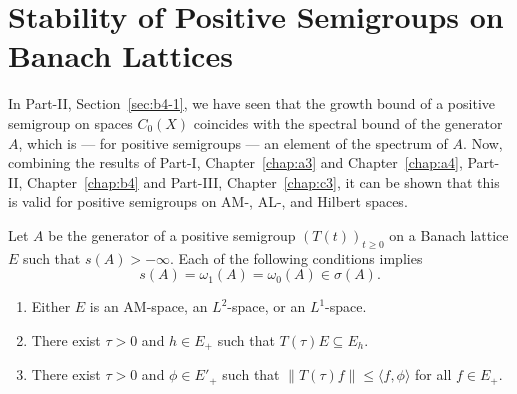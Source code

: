 \section{Stability of Positive Semigroups on Banach Lattices}\label{sec:c4-1} 
\hspace{1cm}{\Large by Günther Greiner and Frank Neubrander}
\vspace{.5cm}
\newline
In Part-II, Section~\ref{sec:b4-1}, we have seen that the growth bound of a positive semigroup on spaces $C_{0}(X)$ coincides with the spectral bound of the generator $A$, which is --- for positive semigroups --- an element of the spectrum of\/ $A$.
Now, combining the results of Part-I, Chapter~\ref{chap:a3} and Chapter~\ref{chap:a4},  
Part-II, Chapter~\ref{chap:b4} and Part-III, Chapter~\ref{chap:c3}, it can be shown that this is valid for positive semigroups on AM-, AL-, and Hilbert spaces.
\begin{theorem}\label{thm:c4-1.1}
Let $A$ be the generator of a positive semigroup $(T(t))_{t \geq 0}$ on a Banach lattice $E$ such that $s(A) > -\infty$.
Each of the following conditions implies
\begin{equation*}\label{eq:c4-1.0-kgk}
s(A) = \omega_{1}(A) = \omega_{0}(A) \in \sigma(A) .
\end{equation*}
\begin{enumerate}[\upshape (i)] 
    \item \label{thm:c4-1.1-1}
    Either $E$ is an AM-space,  an $L^{2}$-space, or an $L^{1}$-space.
    
    \item \label{thm:c4-1.1-2}
    There exist $\tau > 0$ and $h \in E_{+}$ such that $T(\tau)E \subseteq E_{h}$.
    
    \item \label{thm:c4-1.1-3}
    There exist $\tau > 0$ and $\phi \in E'_{+}$ such that $\|T(\tau)f\| \leq \langle f,\phi\rangle$ for all $f \in E_{+}$.
\end{enumerate}
\end{theorem}
